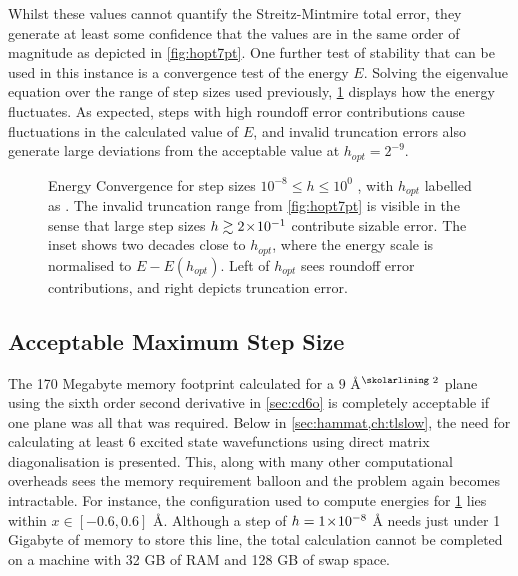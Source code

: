 Whilst these values cannot quantify the Streitz-Mintmire total error, they generate at least some confidence that the values are in the same order of magnitude as depicted in \cref{fig:hopt7pt}.
One further test of stability that can be used in this instance is a convergence test of the energy $E$.
Solving the eigenvalue equation over the range of step sizes used previously, \cref{fig:econv} displays how the energy fluctuates.
As expected, steps with high roundoff error contributions cause fluctuations in the calculated value of $E$, and invalid truncation errors also generate large deviations from the acceptable value at $h_{opt} = 2^{-9}$.
\begin{figure}[htp]
\centering
\resizebox{0.9\textwidth}{!}{}
\caption[Energy Convergence]{\label{fig:econv}Energy Convergence for step sizes $10^{-8}\!\leq\! h\! \leq\! 10^0$ , with $h_{opt}$ labelled as . The invalid truncation range from \cref{fig:hopt7pt} is visible in the sense that large step sizes $h\gtrsim2\!\times\!10^{-1}$ contribute sizable error. The inset shows two decades close to $h_{opt}$, where the energy scale is normalised to $E-E(h_{opt})$. Left of $h_{opt}$ sees roundoff error contributions, and right depicts truncation error.}
\end{figure}

\subsection{Acceptable Maximum Step Size}\label{sec:hmax}

The 170 Megabyte memory footprint calculated for a $9$ Å$^\text{\skolarlining 2}$ plane using the sixth order second derivative in \cref{sec:cd6o} is completely acceptable if one plane was all that was required.
Below in \cref{sec:hammat,ch:tlslow}, the need for calculating at least 6 excited state wavefunctions using direct matrix diagonalisation is presented.
This, along with many other computational overheads sees the memory requirement balloon and the problem again becomes intractable.
For instance, the  configuration used to compute energies for \cref{fig:econv} lies within $x \in [-0.6, 0.6]$ Å.
Although a step of $h = 1\!\times\!10^{-8}$ Å needs just under 1 Gigabyte of memory to store this line, the total calculation cannot be completed on a machine with 32 GB of RAM and 128 GB of swap space.

